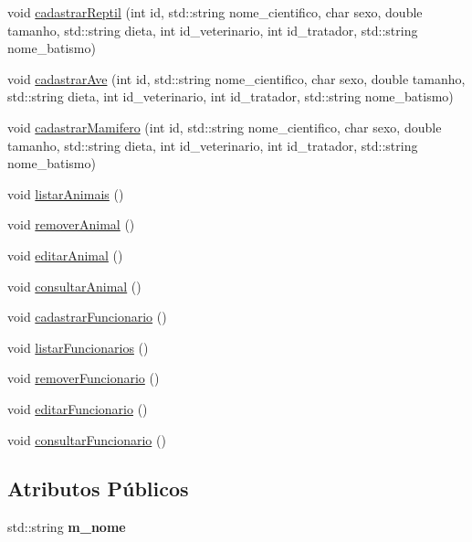 \begin{DoxyCompactItemize}
\item 
void \hyperlink{classPetshop_a7758d5a4e1893c72afd5ff7b3793d726}{cadastrar\+Reptil} (int id, std\+::string nome\+\_\+cientifico, char sexo, double tamanho, std\+::string dieta, int id\+\_\+veterinario, int id\+\_\+tratador, std\+::string nome\+\_\+batismo)
\item 
void \hyperlink{classPetshop_aab4d8b4855b0757cb8a76b7ffab4d6d1}{cadastrar\+Ave} (int id, std\+::string nome\+\_\+cientifico, char sexo, double tamanho, std\+::string dieta, int id\+\_\+veterinario, int id\+\_\+tratador, std\+::string nome\+\_\+batismo)
\item 
void \hyperlink{classPetshop_a28183f85c0d6a0073da2fbb7082a6abe}{cadastrar\+Mamifero} (int id, std\+::string nome\+\_\+cientifico, char sexo, double tamanho, std\+::string dieta, int id\+\_\+veterinario, int id\+\_\+tratador, std\+::string nome\+\_\+batismo)
\item 
void \hyperlink{classPetshop_a29770b7025d7b1f84e2dc946e730463e}{listar\+Animais} ()
\item 
void \hyperlink{classPetshop_a745038ad9cb1b173bfadef5043bfc655}{remover\+Animal} ()
\item 
void \hyperlink{classPetshop_aeb3366966b03bbe1ed6fd5065147b4fa}{editar\+Animal} ()
\item 
void \hyperlink{classPetshop_af6e4fc598318c6ef7d9789a9328e312a}{consultar\+Animal} ()
\item 
void \hyperlink{classPetshop_a14c1c5c2ce819a4e90ed562fc9384f03}{cadastrar\+Funcionario} ()
\item 
void \hyperlink{classPetshop_a92af46eb9dea6df3b89ce06f0e27e599}{listar\+Funcionarios} ()
\item 
void \hyperlink{classPetshop_af427ab474b72f1c1537d4c7fa055290d}{remover\+Funcionario} ()
\item 
void \hyperlink{classPetshop_afffa95f1248cdf9999c40b16d469af2a}{editar\+Funcionario} ()
\item 
void \hyperlink{classPetshop_ab4324d868f6aceeaa9ee34a9ae3b8349}{consultar\+Funcionario} ()
\end{DoxyCompactItemize}
\subsection*{Atributos Públicos}
\begin{DoxyCompactItemize}
\item 
\mbox{\label{classPetshop_ae96ecbb58123958ab00d4b3610bc8ae7}} 
std\+::string {\bfseries m\+\_\+nome}
\end{DoxyCompactItemize}


